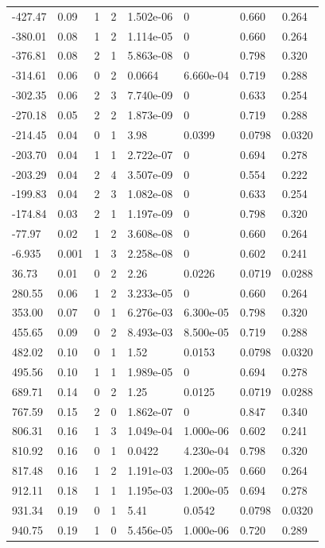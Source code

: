 \documentclass[preview]{standalone}
\begin{document}
{{\begin{tabular}{L{1.2cm}C{1.2cm} C{0.3cm}C{0.5cm} C{1.4cm}C{1.4cm} C{1.4cm}C{1.4cm}}
  -427.47  &  0.09  & 1     &  2 &  1.502e-06  & 0  & 0.660 &  0.264   \\ 
  -380.01  &  0.08  & 1     &  2 &  1.114e-05  & 0  & 0.660 &  0.264   \\ 
  -376.81  &  0.08  & 2     &  1 &  5.863e-08  & 0  & 0.798 &  0.320   \\ 
  -314.61  &  0.06  & 0     &  2 &  0.0664  & 6.660e-04  & 0.719 &  0.288   \\ 
  -302.35  &  0.06  & 2     &  3 &  7.740e-09  & 0  & 0.633 &  0.254   \\ 
  -270.18  &  0.05  & 2     &  2 &  1.873e-09  & 0  & 0.719 &  0.288   \\ 
  -214.45  &  0.04  & 0     &  1 &  3.98  & 0.0399  & 0.0798 &  0.0320   \\ 
  -203.70  &  0.04  & 1     &  1 &  2.722e-07  & 0  & 0.694 &  0.278   \\ 
  -203.29  &  0.04  & 2     &  4 &  3.507e-09  & 0  & 0.554 &  0.222   \\ 
  -199.83  &  0.04  & 2     &  3 &  1.082e-08  & 0  & 0.633 &  0.254   \\ 
  -174.84  &  0.03  & 2     &  1 &  1.197e-09  & 0  & 0.798 &  0.320   \\ 
  -77.97  &  0.02  & 1     &  2 &  3.608e-08  & 0  & 0.660 &  0.264   \\ 
  -6.935  &  0.001  & 1     &  3 &  2.258e-08  & 0  & 0.602 &  0.241   \\ 
  36.73  &  0.01  & 0     &  2 &  2.26  & 0.0226  & 0.0719 &  0.0288   \\ 
  280.55  &  0.06  & 1     &  2 &  3.233e-05  & 0  & 0.660 &  0.264   \\ 
  353.00  &  0.07  & 0     &  1 &  6.276e-03  & 6.300e-05  & 0.798 &  0.320   \\ 
  455.65  &  0.09  & 0     &  2 &  8.493e-03  & 8.500e-05  & 0.719 &  0.288   \\ 
  482.02  &  0.10  & 0     &  1 &  1.52  & 0.0153  & 0.0798 &  0.0320   \\ 
  495.56  &  0.10  & 1     &  1 &  1.989e-05  & 0  & 0.694 &  0.278   \\ 
  689.71  &  0.14  & 0     &  2 &  1.25  & 0.0125  & 0.0719 &  0.0288   \\ 
  767.59  &  0.15  & 2     &  0 &  1.862e-07  & 0  & 0.847 &  0.340   \\ 
  806.31  &  0.16  & 1     &  3 &  1.049e-04  & 1.000e-06  & 0.602 &  0.241   \\ 
  810.92  &  0.16  & 0     &  1 &  0.0422  & 4.230e-04  & 0.798 &  0.320   \\ 
  817.48  &  0.16  & 1     &  2 &  1.191e-03  & 1.200e-05  & 0.660 &  0.264   \\ 
  912.11  &  0.18  & 1     &  1 &  1.195e-03  & 1.200e-05  & 0.694 &  0.278   \\ 
  931.34  &  0.19  & 0     &  1 &  5.41  & 0.0542  & 0.0798 &  0.0320   \\ 
  940.75  &  0.19  & 1     &  0 &  5.456e-05  & 1.000e-06  & 0.720 &  0.289   \\ 
\hline 
\end{tabular} 

}}
\end{document}
